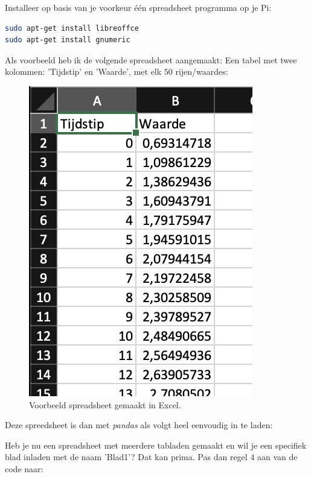 \begin{exercise}
Installeer op basis van je voorkeur één spreadsheet programma op je Pi:
\begin{lstlisting}[language=bash]
sudo apt-get install libreoffce
sudo apt-get install gnumeric
\end{lstlisting}
\end{exercise}

Als voorbeeld heb ik de volgende spreadsheet aangemaakt: Een tabel met twee kolommen: 'Tijdstip' en 'Waarde', met elk $50$ rijen/waardes: 
\begin{figure}[h!]
\centering\includegraphics[scale=0.5]{Pictures/chapter07/excel1.png}
\caption{Voorbeeld spreadsheet gemaakt in Excel.}
\label{fig:excel1} %
\end{figure}

\newpage

Deze spreedsheet is dan met \textit{pandas} als volgt heel eenvoudig in te laden:

\begin{remark}
Heb je nu een spreadsheet met meerdere tabladen gemaakt en wil je een specifiek blad inladen met de naam 'Blad1'? Dat kan prima. Pas dan regel $4$ aan van de code naar: \\
\end{remark}

